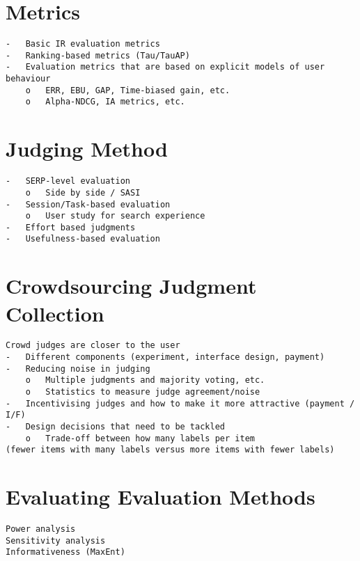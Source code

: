 \documentclass[openany]{now} %
\begin{document}
\chapter{Metrics}

\begin{verbatim}
-	Basic IR evaluation metrics 
-	Ranking-based metrics (Tau/TauAP)
-	Evaluation metrics that are based on explicit models of user behaviour
	o	ERR, EBU, GAP, Time-biased gain, etc.
	o	Alpha-NDCG, IA metrics, etc.
\end{verbatim}

\chapter{Judging Method}

\begin{verbatim}
-	SERP-level evaluation 
	o	Side by side / SASI
-	Session/Task-based evaluation
	o	User study for search experience
-	Effort based judgments
-	Usefulness-based evaluation
\end{verbatim}

\cite{Chandar2013} \cite{Al-Maskari2007} \cite{Bailey2010} \cite{CarteretteBCD08}

\chapter{Crowdsourcing Judgment Collection}

\begin{verbatim}
Crowd judges are closer to the user
-	Different components (experiment, interface design, payment)
-	Reducing noise in judging
	o	Multiple judgments and majority voting, etc.
	o	Statistics to measure judge agreement/noise
-	Incentivising judges and how to make it more attractive (payment / I/F)
-	Design decisions that need to be tackled
	o	Trade-off between how many labels per item 
(fewer items with many labels versus more items with fewer labels)
\end{verbatim}

\cite{Megorskaya2015}

\chapter{Evaluating Evaluation Methods}

\begin{verbatim}
Power analysis
Sensitivity analysis
Informativeness (MaxEnt)
\end{verbatim}
\end{document}
